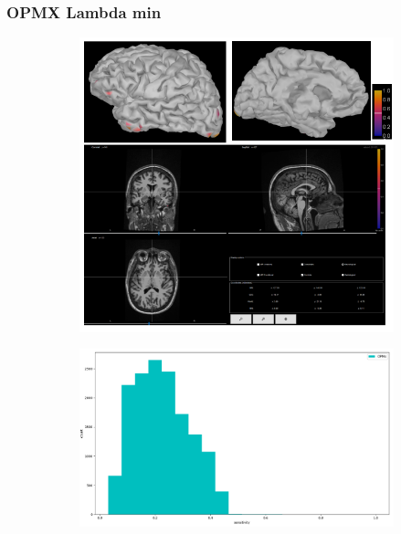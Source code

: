 \documentclass{beamer}
\numberwithin{figure}{section}
\numberwithin{equation}{section}
\begin{document}

\section{}
\begin{frame}
 \frametitle{OPMX Lambda min}
  

 	\begin{figure}[h]
        \begin{subfigure}[h]{0.53\linewidth} 
            \includegraphics[width=\linewidth]{pictures/OPMX3}
            \label{fig:rdf_graph}
        \end{subfigure}       
        \begin{subfigure}[h]{0.45\linewidth} 
            \includegraphics[width=\linewidth]{pictures/opmx2}
            \label{fig:rdfs_graph}
        \end{subfigure}
    \end{figure}

  
\end{frame}
\end{document}
